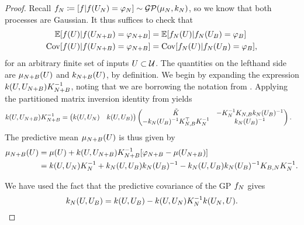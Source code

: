 \documentclass[12pt]{article}
\begin{document}
\begin{proof} 
Recall $\funcEm[\Ndesign] \Def [\func | \func(\designIn[\Ndesign]) = \funcVal[\Ndesign]] \sim \GP(\gpMean[\Ndesign], \gpKer[\Ndesign])$, so we know that 
both processes are Gaussian. It thus suffices to check that 
\begin{align*}
\E[\func(\parMat) | \func(\designIn[\Naugment]) = \funcVal[\Naugment]] 
&= \E[\funcEm[\Ndesign](\parMat) | \funcEm[\Ndesign](\designIn[\Nbatch]) = \funcVal[\Nbatch]] \\
\Cov[\func(\parMat) | \func(\designIn[\Naugment]) = \funcVal[\Naugment]] 
&= \Cov[\funcEm[\Ndesign](\parMat) | \funcEm[\Ndesign](\designIn[\Nbatch]) = \funcVal[\Nbatch]],
\end{align*}
for an arbitrary finite set of inputs $\parMat \subset \parSpace$. The quantities on the lefthand side are 
$\gpMean[\Naugment](\parMat)$ and $\gpKer[\Naugment](\parMat)$, by definition. We begin by expanding 
the expression $\gpKerPrior(\parMat, \designIn[\Naugment]) \kerMat[\Naugment]^{-1}$, noting that we 
are borrowing the notation from . Applying the partitioned matrix 
inversion identity from  yields 
\begin{align*}
\gpKerPrior(\parMat, \designIn[\Naugment]) \kerMat[\Naugment]^{-1}
&= \begin{pmatrix} \gpKerPrior(\parMat, \designIn[\Ndesign]) &  \gpKerPrior(\parMat, \designIn[\Nbatch]) \end{pmatrix}
\begin{pmatrix} \tilde{K} & -\kerMat[\Ndesign]^{-1} \kerMat[\Ndesign,\Nbatch] \gpKer[\Ndesign](\designBatchIn)^{-1} \\
-\gpKer[\Ndesign](\designBatchIn)^{-1} \kerMat[\Ndesign,\Nbatch]^\top  \kerMat[\Ndesign]^{-1} & \gpKer[\Ndesign](\designBatchIn)^{-1} \end{pmatrix}.
\end{align*}
The predictive mean $\gpMean[\Naugment](\parMat)$ is thus given by 
\begin{align*}
\gpMean[\Naugment](\parMat)
&= \gpMeanPrior(\parMat) + \gpKerPrior(\parMat, \designIn[\Naugment]) \kerMat[\Naugment]^{-1}[\funcVal[\Naugment] - \gpMeanPrior(\designIn[\Naugment])] \\
&= \gpKerPrior(\parMat, \designIn[\Ndesign])\kerMat[\Ndesign]^{-1} + \gpKer[\Ndesign](\parMat, \designIn[\Nbatch]) \gpKer[\Ndesign](\designIn[\Nbatch])^{-1} - 
\gpKer[\Ndesign](\parMat, \designIn[\Nbatch]) \gpKer[\Ndesign](\designIn[\Nbatch])^{-1} \kerMat[\Nbatch,\Ndesign]\kerMat[\Ndesign]^{-1}.
\end{align*}



We have used the fact that the predictive covariance of the GP $\funcEm[\Ndesign]$ gives 
\[
\gpKer[\Ndesign](\parMat, \designIn[\Nbatch]) = \gpKerPrior(\parMat, \designIn[\Nbatch]) - 
\gpKerPrior(\parMat, \designIn[\Ndesign])\kerMat[\Ndesign]^{-1} \gpKerPrior(\designIn[\Ndesign], \parMat).
\]

\end{proof}
\end{document}
